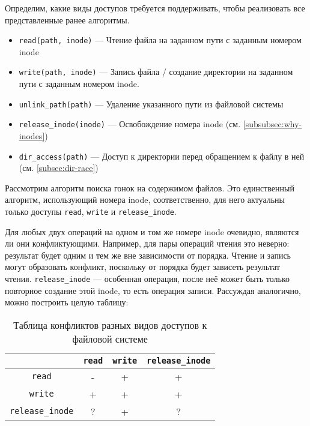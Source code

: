 Определим, какие виды доступов требуется поддерживать, чтобы реализовать все представленные ранее алгоритмы.

\begin{itemize}
    \item \texttt{read(path, inode)} --- Чтение файла на заданном пути с заданным номером inode
    \item \texttt{write(path, inode)} --- Запись файла / создание директории на заданном пути с заданным номером inode.
    \item \texttt{unlink\_path(path)} --- Удаление указанного пути из файловой системы
    \item \texttt{release\_inode(inode)} --- Освобождение номера inode (см. \ref{subsubsec:why-inodes})
    \item \texttt{dir\_access(path)} --- Доступ к директории перед обращением к файлу в ней (см. \ref{subsec:dir-race})
\end{itemize}

Рассмотрим алгоритм поиска гонок на содержимом файлов. Это единственный алгоритм, использующий номера inode, соответственно, для него актуальны только доступы \texttt{read}, \texttt{write} и \texttt{release\_inode}.

Для любых двух операций на одном и том же номере inode очевидно, являются ли они конфликтующими. Например, для пары операций чтения это неверно: результат будет одним и тем же вне зависимости от порядка. Чтение и запись могут образовать конфликт, поскольку от порядка будет зависеть результат чтения. \texttt{release\_inode} --- особенная операция, после неё может быть только повторное создание этой inode, то есть операция записи. Рассуждая аналогично, можно построить целую таблицу:

\begin{table}[htbp]
    \centering
    \begin{tabular}{cccc}
        \toprule
        & \texttt{read} & \texttt{write} & \texttt{release\_inode} \\
        \midrule
        \texttt{read} & - & + & + \\
        \texttt{write} & + & + & + \\
        \texttt{release\_inode} & ? & + & ? \\
        \bottomrule
    \end{tabular}
    \caption{Таблица конфликтов разных видов доступов к файловой системе}
    \label{fig:conflict-table}
\end{table}

